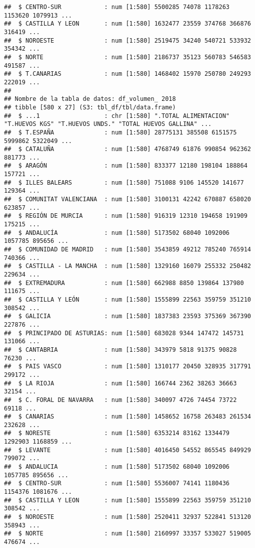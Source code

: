 \documentclass[
]{article}
\begin{document}
\begin{verbatim}
##  $ CENTRO-SUR            : num [1:580] 5500285 74078 1178263 1153620 1079913 ...
##  $ CASTILLA Y LEON       : num [1:580] 1632477 23559 374768 366876 316419 ...
##  $ NOROESTE              : num [1:580] 2519475 34240 540721 533932 354342 ...
##  $ NORTE                 : num [1:580] 2186737 35123 560783 546583 491587 ...
##  $ T.CANARIAS            : num [1:580] 1468402 15970 250780 249293 222019 ...
##  
## Nombre de la tabla de datos: df_volumen_ 2018 
## tibble [580 x 27] (S3: tbl_df/tbl/data.frame)
##  $ ...1                  : chr [1:580] ".TOTAL ALIMENTACION" "T.HUEVOS KGS" "T.HUEVOS UNDS." "TOTAL HUEVOS GALLINA" ...
##  $ T.ESPAÑA              : num [1:580] 28775131 385508 6151575 5999862 5322049 ...
##  $ CATALUÑA              : num [1:580] 4768749 61876 990854 962362 881773 ...
##  $ ARAGÓN                : num [1:580] 833377 12180 198104 188864 157721 ...
##  $ ILLES BALEARS         : num [1:580] 751088 9106 145520 141677 129364 ...
##  $ COMUNITAT VALENCIANA  : num [1:580] 3100131 42242 670887 658020 623857 ...
##  $ REGIÓN DE MURCIA      : num [1:580] 916319 12310 194658 191909 175215 ...
##  $ ANDALUCÍA             : num [1:580] 5173502 68040 1092006 1057785 895656 ...
##  $ COMUNIDAD DE MADRID   : num [1:580] 3543859 49212 785240 765914 740366 ...
##  $ CASTILLA - LA MANCHA  : num [1:580] 1329160 16079 255332 250482 229634 ...
##  $ EXTREMADURA           : num [1:580] 662988 8850 139864 137980 111675 ...
##  $ CASTILLA Y LEÓN       : num [1:580] 1555899 22563 359759 351210 308542 ...
##  $ GALICIA               : num [1:580] 1837383 23593 375369 367390 227876 ...
##  $ PRINCIPADO DE ASTURIAS: num [1:580] 683028 9344 147472 145731 131066 ...
##  $ CANTABRIA             : num [1:580] 343979 5818 91375 90828 76230 ...
##  $ PAIS VASCO            : num [1:580] 1310177 20450 328935 317791 299172 ...
##  $ LA RIOJA              : num [1:580] 166744 2362 38263 36663 32154 ...
##  $ C. FORAL DE NAVARRA   : num [1:580] 340097 4726 74454 73722 69118 ...
##  $ CANARIAS              : num [1:580] 1458652 16758 263483 261534 232628 ...
##  $ NORESTE               : num [1:580] 6353214 83162 1334479 1292903 1168859 ...
##  $ LEVANTE               : num [1:580] 4016450 54552 865545 849929 799072 ...
##  $ ANDALUCIA             : num [1:580] 5173502 68040 1092006 1057785 895656 ...
##  $ CENTRO-SUR            : num [1:580] 5536007 74141 1180436 1154376 1081676 ...
##  $ CASTILLA Y LEON       : num [1:580] 1555899 22563 359759 351210 308542 ...
##  $ NOROESTE              : num [1:580] 2520411 32937 522841 513120 358943 ...
##  $ NORTE                 : num [1:580] 2160997 33357 533027 519005 476674 ...

\end{verbatim}
\end{document}
